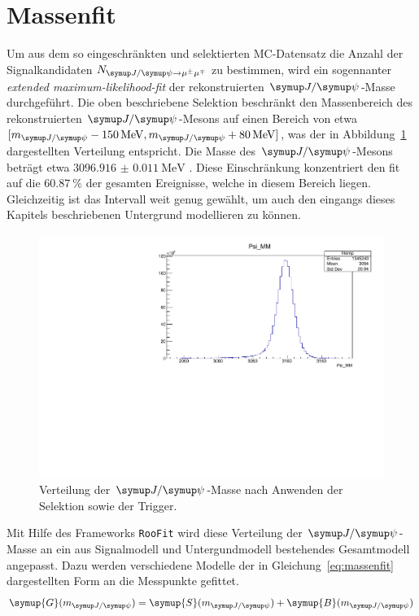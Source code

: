 \section{Massenfit}
%
Um aus dem so eingeschränkten und selektierten MC-Datensatz die Anzahl der Signalkandidaten $N_{\kontroll}$ zu bestimmen, wird ein sogennanter \textit{extended maximum-likelihood-fit} \cite{extended} der rekonstruierten $\jpsi$-Masse durchgeführt. Die oben beschriebene Selektion beschränkt den Massenbereich des rekonstruierten $\jpsi$-Mesons auf einen Bereich von etwa $[m_{\jpsi}-\SI{150}{\mega\electronvolt},
m_{\jpsi}+\SI{80}{\mega\electronvolt}]$, was der in Abbildung~\ref{fig:mass} dargestellten Verteilung entspricht. Die Masse des $\jpsi$-Mesons beträgt etwa $\SI{3096.916(11)}{\mega\electronvolt}$ \cite{pdg}. Diese Einschränkung konzentriert den fit auf die $\SI{60.87}{\percent}$ der gesamten Ereignisse, welche in diesem Bereich liegen. Gleichzeitig ist das Intervall weit genug gewählt, um auch den eingangs dieses Kapitels beschriebenen Untergrund modellieren zu können.
%
\begin{figure}[H]
  \centering
      \includegraphics[width=\textwidth]{Plots/jpsi_mass.pdf}
  \caption{Verteilung der $\jpsi$-Masse nach Anwenden der Selektion sowie der Trigger.}
  \label{fig:mass}
\end{figure}
%
Mit Hilfe des Frameworks \texttt{RooFit} \cite{roofit} wird diese Verteilung der $\jpsi$-Masse an ein aus Signalmodell und Untergundmodell bestehendes Gesamtmodell angepasst. Dazu werden verschiedene Modelle der in Gleichung~\ref{eq:massenfit} dargestellten Form an die Messpunkte gefittet.
%
\begin{equation}
  \symup{G}(m_{\jpsi})= \symup{S}(m_{\jpsi}) + \symup{B}(m_{\jpsi})
  \label{eq:massenfit}
\end{equation}
